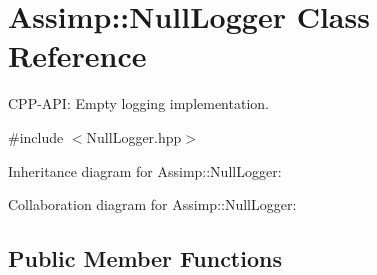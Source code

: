\hypertarget{class_assimp_1_1_null_logger}{\section{Assimp\-:\-:Null\-Logger Class Reference}
\label{class_assimp_1_1_null_logger}
}


C\-P\-P-\/\-A\-P\-I\-: Empty logging implementation.  




{\ttfamily \#include $<$Null\-Logger.\-hpp$>$}



Inheritance diagram for Assimp\-:\-:Null\-Logger\-:


Collaboration diagram for Assimp\-:\-:Null\-Logger\-:
\subsection*{Public Member Functions}
